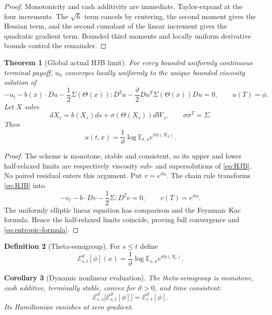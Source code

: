 \documentclass[11pt,reqno]{amsart}
\newtheorem{theorem}{Theorem}[section]
\newtheorem{corollary}[theorem]{Corollary}
\theoremstyle{definition}
\newtheorem{definition}[theorem]{Definition}
\theoremstyle{remark}
\newcommand{\E}{\mathbb E}
\newcommand{\cE}{\mathcal E}
\begin{document}
\begin{proof}
Monotonicity and cash additivity are immediate.  Taylor-expand at the four
increments.  The $\sqrt h$ term cancels by centering, the second moment gives
the Hessian term, and the second cumulant of the linear increment gives the
quadratic gradient term.  Bounded third moments and locally uniform derivative
bounds control the remainder.
\end{proof}

\begin{theorem}[Global actual HJB limit]\label{thm:HJB}
For every bounded uniformly continuous terminal payoff, $u_h$ converges
locally uniformly to the unique bounded viscosity solution of
\begin{equation}\label{eq:HJB}
 -u_t-b(x)\cdot Du
 -\frac12\Sigma(\Theta(x)):D^2u
 -\frac\vartheta2Du^T\Sigma(\Theta(x))Du=0,
 \qquad u(T)=\phi.
\end{equation}
Let $X$ solve
\[
 dX_s=b(X_s)ds+\sigma(\Theta(X_s))dW_s,
 \qquad \sigma\sigma^T=\Sigma.
\]
Then
\begin{equation}\label{eq:entropic-formula}
 u(t,x)=\frac1\vartheta
 \log\E_{t,x}e^{\vartheta\phi(X_T)}.
\end{equation}
\end{theorem}

\begin{proof}
The scheme is monotone, stable and consistent, so its upper and lower
half-relaxed limits are respectively viscosity sub- and supersolutions of
\eqref{eq:HJB}.  No paired residual enters this argument.  Put
$v=e^{\vartheta u}$.  The chain rule transforms \eqref{eq:HJB} into
\[
 -v_t-b\cdot Dv-\frac12\Sigma:D^2v=0,
 \qquad v(T)=e^{\vartheta\phi}.
\]
The uniformly elliptic linear equation has comparison and the Feynman--Kac
formula.  Hence the half-relaxed limits coincide, proving full convergence and
\eqref{eq:entropic-formula}.
\end{proof}

\begin{definition}[Theta-semigroup]
For $s\le t$ define
\[
 \cE_{s,t}^{\vartheta}[\phi](x)
 =\frac1\vartheta\log\E_{s,x}e^{\vartheta\phi(X_t)}.
\]
\end{definition}

\begin{corollary}[Dynamic nonlinear evaluation]\label{cor:theta}
The theta-semigroup is monotone, cash additive, terminally stable, convex for
$\vartheta>0$, and time consistent:
\[
 \cE_{r,s}^{\vartheta}
 \bigl[\cE_{s,t}^{\vartheta}[\phi]\bigr]
 =\cE_{r,t}^{\vartheta}[\phi].
\]
Its Hamiltonian vanishes at zero gradient.
\end{corollary}
\end{document}
